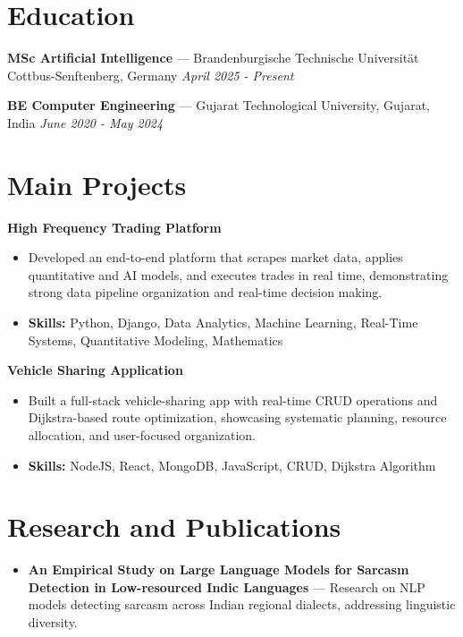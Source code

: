 \documentclass[a4paper,10pt]{article}
\begin{document}
\section*{Education}
\textbf{MSc Artificial Intelligence} — Brandenburgische Technische Universität Cottbus-Senftenberg, Germany \hfill \textit{April 2025 - Present}\par
\vspace{1.5pt}
\textbf{BE Computer Engineering} — Gujarat Technological University, Gujarat, India \hfill \textit{June 2020 - May 2024}\par

\section*{Main Projects}
\textbf{High Frequency Trading Platform}\par
\vspace{1pt}
\begin{itemize}
  \item Developed an end-to-end platform that scrapes market data, applies quantitative and AI models, and executes trades in real time, demonstrating strong data pipeline organization and real-time decision making.
  \item \textbf{Skills:} Python, Django, Data Analytics, Machine Learning, Real-Time Systems, Quantitative Modeling, Mathematics
\end{itemize}
\vspace{3pt}
\textbf{Vehicle Sharing Application}\par
\vspace{1pt}
\begin{itemize}
  \item Built a full-stack vehicle-sharing app with real-time CRUD operations and Dijkstra-based route optimization, showcasing systematic planning, resource allocation, and user-focused organization.
  \item \textbf{Skills:} NodeJS, React, MongoDB, JavaScript, CRUD, Dijkstra Algorithm
\end{itemize}

\section*{Research and Publications}
\begin{itemize}
\item \textbf{An Empirical Study on Large Language Models for Sarcasm Detection in Low-resourced Indic Languages} — Research on NLP models detecting sarcasm across Indian regional dialects, addressing linguistic diversity.
\end{itemize}
\end{document}

